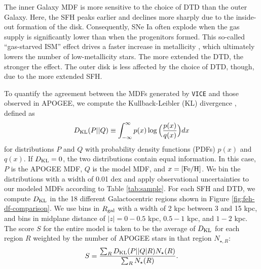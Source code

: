\documentclass[twocolumn,twocolappendix,linenumbers]{aastex631}
\newcommand{\vice}{{\tt VICE}\xspace}
\begin{document}
The inner Galaxy MDF is more sensitive to the choice of DTD than the outer Galaxy. Here, the SFH peaks earlier and declines more sharply due to the inside-out formation of the disk. Consequently, SNe Ia often explode when the gas supply is significantly lower than when the progenitors formed. This so-called ``gas-starved ISM'' effect drives a faster increase in metallicity \citep[see analytic demonstration in][]{Weinberg2017-ChemicalEquilibrium}, which ultimately lowers the number of low-metallicity stars. The more extended the DTD, the stronger the effect. The outer disk is less affected by the choice of DTD, though, due to the more extended SFH.

To quantify the agreement between the MDFs generated by \vice and those observed in APOGEE, we compute the Kullback-Leibler (KL) divergence \citep{KullbackLeibler1951}, defined as
\begin{equation}
    D_{\rm{KL}}(P||Q) \equiv \int_{-\infty}^{\infty} p(x) \log\Big(\frac{p(x)}{q(x)}\Big) dx
    \label{eq:kl-divergence}
\end{equation}
for distributions $P$ and $Q$ with probability density functions (PDFs) $p(x)$ and $q(x)$. If $D_{\rm KL}=0$, the two distributions contain equal information. In this case, $P$ is the APOGEE MDF, $Q$ is the model MDF, and $x={\rm [Fe/H]}$. We bin the distributions with a width of 0.01 dex and apply observational uncertainties to our modeled MDFs according to Table \ref{tab:sample}. For each SFH and DTD, we compute $D_{\rm{KL}}$ in the 18 different Galactocentric regions shown in Figure \ref{fig:feh-df-comparison}. We use bins in $R_{\rm gal}$ with a width of 2 kpc between 3 and 15 kpc, and bins in midplane distance of $|z|=0-0.5$ kpc, $0.5-1$ kpc, and $1-2$ kpc. The score $S$ for the entire model is taken to be the average of $D_{\rm{KL}}$ for each region $R$ weighted by the number of APOGEE stars in that region $N_{\star,R}$:
\begin{equation}
    S = \frac{\sum_R D_{\rm KL}(P||Q|R) N_\star(R)}{\sum_R N_\star(R)}.
    \label{eq:feh-df-score}
\end{equation}
\end{document}
